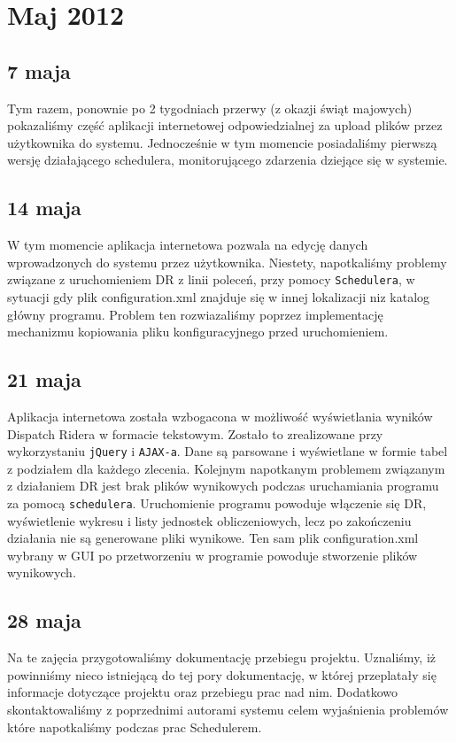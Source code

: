 \section{Maj 2012}
\subsection{7 maja}
Tym razem, ponownie po 2 tygodniach przerwy (z okazji świąt majowych) pokazaliśmy część aplikacji internetowej odpowiedzialnej za 
upload plików przez użytkownika do systemu. Jednocześnie w tym momencie posiadaliśmy pierwszą wersję działającego schedulera, monitorującego
zdarzenia dziejące się w systemie.

\subsection{14 maja}
W tym momencie aplikacja internetowa pozwala na edycję danych wprowadzonych do systemu przez użytkownika. 
Niestety, napotkaliśmy problemy związane z uruchomieniem DR z linii poleceń, przy pomocy \texttt{Schedulera}, w sytuacji gdy plik configuration.xml znajduje się w innej lokalizacji niz katalog główny programu. Problem ten rozwiazaliśmy poprzez implementację mechanizmu kopiowania pliku konfiguracyjnego przed uruchomieniem.

\subsection{21 maja}
Aplikacja internetowa została wzbogacona w możliwość wyświetlania wyników Dispatch Ridera w formacie tekstowym.
Zostało to zrealizowane przy wykorzystaniu \texttt{jQuery} i  \texttt{AJAX-a}. Dane są parsowane i wyświetlane w formie tabel
z podziałem dla każdego zlecenia. Kolejnym napotkanym problemem związanym z działaniem DR jest brak plików wynikowych podczas uruchamiania programu za pomocą \texttt{schedulera}. Uruchomienie programu powoduje włączenie się DR, wyświetlenie wykresu i listy jednostek obliczeniowych, lecz po zakończeniu działania nie są generowane pliki wynikowe. Ten sam plik configuration.xml wybrany w GUI po przetworzeniu w programie powoduje stworzenie plików wynikowych. 

\subsection{28 maja}
Na te zajęcia przygotowaliśmy dokumentację przebiegu projektu. Uznaliśmy, iż powinniśmy nieco  istniejącą do tej pory dokumentację,
w której przeplatały się informacje dotyczące projektu oraz przebiegu prac nad nim. Dodatkowo skontaktowaliśmy z poprzednimi
autorami systemu celem wyjaśnienia problemów które napotkaliśmy podczas prac Schedulerem.

